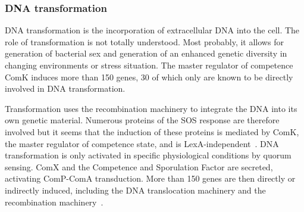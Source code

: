 \subsubsection{DNA transformation}

DNA transformation is the incorporation of extracellular DNA into the cell. The role of transformation is not totally understood. Most probably, it allows for generation of bacterial sex and generation of an enhanced genetic diversity in changing environments or stress situation. The master regulator of competence ComK induces more than 150 genes, 30 of which only are known to be directly involved in DNA transformation.

Transformation uses the recombination machinery to integrate the DNA into its own genetic material. Numerous proteins of the SOS response are therefore involved but it seems that the induction of these proteins is mediated by ComK, the master regulator of competence state, and is LexA-independent~\citep{kidane_cell_2012}. DNA transformation is only activated in specific physiological conditions by quorum sensing. ComX and the Competence and Sporulation Factor are secreted, activating ComP-ComA transduction. More than 150 genes are then directly or indirectly induced, including the DNA translocation machinery and the recombination machinery~\citep{kidane_cell_2012}.

